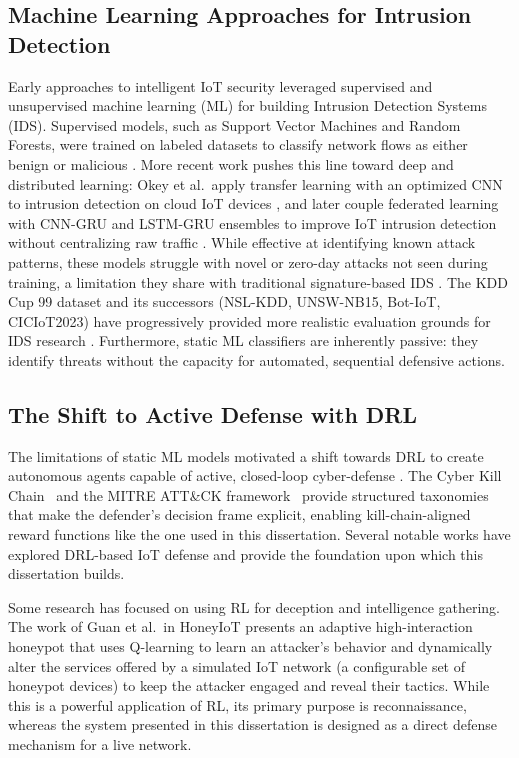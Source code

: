 \subsection{Machine Learning Approaches for Intrusion Detection}
Early approaches to intelligent IoT security leveraged supervised and unsupervised machine learning (ML) for building Intrusion Detection Systems (IDS). Supervised models, such as Support Vector Machines and Random Forests, were trained on labeled datasets to classify network flows as either benign or malicious \cite{AlGaradi2020,DeMedeiros2023,Tawalbeh2020}. More recent work pushes this line toward deep and distributed learning: Okey et al.\ apply transfer learning with an optimized CNN to intrusion detection on cloud IoT devices \cite{Okey2023}, and later couple federated learning with CNN-GRU and LSTM-GRU ensembles to improve IoT intrusion detection without centralizing raw traffic \cite{Okey2024}. While effective at identifying known attack patterns, these models struggle with novel or zero-day attacks not seen during training, a limitation they share with traditional signature-based IDS \cite{Khraisat2019}. The KDD Cup 99 dataset and its successors (NSL-KDD, UNSW-NB15, Bot-IoT, CICIoT2023) have progressively provided more realistic evaluation grounds for IDS research \cite{Tavallaee2009,Koroniotis2019,Neto2023}. Furthermore, static ML classifiers are inherently passive: they identify threats without the capacity for automated, sequential defensive actions.

\subsection{The Shift to Active Defense with DRL}
The limitations of static ML models motivated a shift towards DRL to create autonomous agents capable of active, closed-loop cyber-defense \cite{Uprety2021,Yang2024,Gueriani2023}. The Cyber Kill Chain~\cite{Hutchins2011} and the MITRE ATT\&CK framework~\cite{MITRE2023} provide structured taxonomies that make the defender's decision frame explicit, enabling kill-chain-aligned reward functions like the one used in this dissertation. Several notable works have explored DRL-based IoT defense and provide the foundation upon which this dissertation builds.

Some research has focused on using RL for deception and intelligence gathering. The work of Guan et al.\ in HoneyIoT \cite{Guan2023} presents an adaptive high-interaction honeypot that uses Q-learning to learn an attacker's behavior and dynamically alter the services offered by a simulated IoT network (a configurable set of honeypot devices) to keep the attacker engaged and reveal their tactics. While this is a powerful application of RL, its primary purpose is reconnaissance, whereas the system presented in this dissertation is designed as a direct defense mechanism for a live network.

